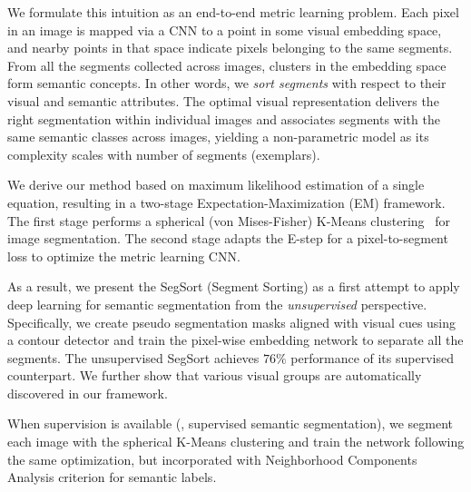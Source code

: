\documentclass[10pt,twocolumn,letterpaper]{article}
\begin{document}
We formulate this intuition as an end-to-end metric learning problem.
Each pixel in an image is mapped via a CNN to a point in some visual embedding space, and nearby points in that space indicate pixels belonging to the same segments.
From all the segments collected across images, clusters in the embedding space form semantic concepts.
In other words, we {\it sort segments} with respect to their visual and semantic attributes.
The optimal visual representation delivers the right segmentation within individual images and associates segments with the same semantic classes across images, yielding a non-parametric model as its complexity scales with number of segments (exemplars).















We derive our method based on maximum likelihood estimation of a single equation, resulting in a two-stage Expectation-Maximization (EM) framework. The first stage performs a spherical (von Mises-Fisher) K-Means clustering~\cite{banerjee2005clustering} for image segmentation. The second stage adapts the E-step for a pixel-to-segment loss to optimize the metric learning CNN.




As a result, we present the SegSort (Segment Sorting) as a first attempt to apply deep learning for semantic segmentation from the {\it unsupervised} perspective. Specifically, we create pseudo segmentation masks aligned with visual cues using a contour detector \cite{arbelaez2011contour,hwang2015pixel,xie2015holistically} and train the pixel-wise embedding network to separate all the segments. The unsupervised SegSort achieves $76\%$ performance of its supervised counterpart. We further show that various visual groups are automatically discovered in our framework.

When supervision is available (\ie, supervised semantic segmentation), we segment each image with the spherical K-Means clustering and train the network following the same optimization, but incorporated with Neighborhood Components Analysis criterion \cite{goldberger2005neighbourhood,wu2018improving} for semantic labels.
\end{document}
